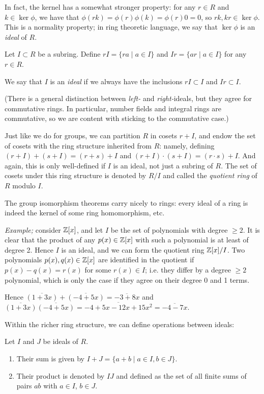 In fact, the kernel has a somewhat stronger property: for any $r\in R$ and $k\in\ker\phi$, we have that $\phi(rk)=\phi(r)\phi(k)=\phi(r)0=0$, so $rk,kr\in\ker\phi$. This is a normality property; in ring theoretic language, we say that $\ker\phi$ is an \emph{ideal} of $R$.

\begin{defn}
	Let $I\subset R$ be a subring. Define $rI=\{ra \mid a\in I\}$ and $Ir=\{ar \mid a\in I\}$ for any $r\in R$.

	We say that $I$ is an \emph{ideal} if we always have the inclusions $rI\subset I$ and $Ir\subset I$.
\end{defn}

(There is a general distinction between \emph{left-} and \emph{right-}ideals, but they agree for commutative rings. In particular, number fields and integral rings are commutative, so we are content with sticking to the commutative case.)

Just like we do for groups, we can partition $R$ in cosets $r+I$, and endow the set of cosets with the ring structure inherited from $R$: namely, defining $(r+I)+(s+I)=(r+s)+I$ and $(r+I)\cdot (s+I) = (r\cdot s) + I$. And again, this is only well-defined if $I$ is an ideal, not just a subring of $R$. The set of cosets under this ring structure is denoted by $R/I$ and called the \emph{quotient ring} of $R$ modulo $I$.

The group isomorphism theorems carry nicely to rings: every ideal of a ring is indeed the kernel of some ring homomorphism, etc.

\emph{Example;} consider $\mathbb{Z}[x]$, and let $I$ be the set of polynomials with degree $\geq 2$. It is clear that the product of any $p(x)\in\mathbb{Z}[x]$ with such a polynomial is at least of degree 2. Hence $I$ is an ideal, and we can form the quotient ring $\mathbb{Z}[x]/I$. Two polynomials $p(x),q(x)\in\mathbb{Z}[x]$ are identified in the quotient if $p(x)-q(x)=r(x)$ for some $r(x)\in I$; i.e. they differ by a degree $\geq 2$ polynomial, which is only the case if they agree on their degree 0 and 1 terms.

Hence $\overline{(1+3x)}+\overline{(-4+5x)}=\overline{-3+8x}$ and $\overline{(1+3x)}\overline{(-4+5x)}=\overline{-4+5x-12x+15x^2}=\overline{-4-7x}$.

Within the richer ring structure, we can define operations between ideals:

\begin{defn}
	Let $I$ and $J$ be ideals of $R$.
	\begin{enumerate}[(1)]
		\item Their sum is given by $I+J=\{a+b \mid a\in I, b\in J\}$.
		\item Their product is denoted by $IJ$ and defined as the set of all finite sums of pairs $ab$ with $a\in I$, $b\in J$.
	\end{enumerate}
\end{defn}

